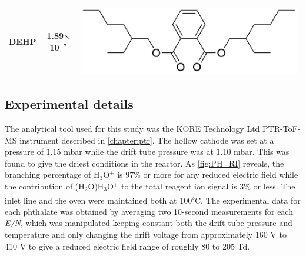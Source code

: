 {\begin{table}
\begin{tabular}{lcc}
DEHP &  1.89$\times$10$^{-7}$   &  \begin{minipage}[c]{0.35\linewidth}\centering
\includegraphics[height=0.07\textheight]{pics/PH/DEHP_struct2.png}\end{minipage}\\ 
\bottomrule
\end{tabular}
\label{tab:PH_structs}
\end{table}

}%



\subsection{Experimental details}

The analytical tool used for this study was the KORE Technology Ltd PTR-ToF-MS instrument described in \autoref{chapter:ptr}.
%
The hollow cathode was set at a pressure of 1.15 mbar while the drift tube pressure was at 1.10 mbar.
%
This was found to give the driest conditions in the reactor.
%
As \autoref{fig:PH_RI} reveals, the branching  percentage of H$_3$O$^+$ is   97\% or more for any reduced electric field while the contribution of  (H$_2$O)H$_3$O$^+$ to the total reagent ion signal is 3\% or less.
%
The inlet line and the oven were maintained both at 100\textsuperscript{$\circ$}C.
%
The experimental data for each phthalate was obtained by averaging two 10-second measurements for each \textit{E/N}, which was manipulated keeping constant both  the drift tube pressure and  temperature and only changing the drift voltage  from approximately 160 V to 410 V to give a reduced electric field range of roughly 80 to 205 Td.




